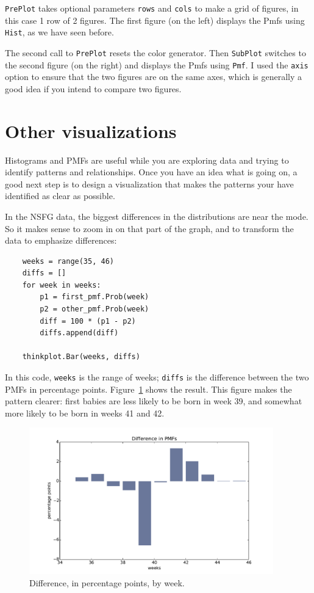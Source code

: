 \documentclass[12pt]{book}
\begin{document}
{\tt PrePlot} takes optional parameters {\tt rows} and {\tt cols}
to make a grid of figures, in this case 1 row of 2 figures.
The first figure (on the left) displays the Pmfs using {\tt Hist},
as we have seen before.

The second call to {\tt PrePlot} resets the color generator.  Then
{\tt SubPlot} switches to the second figure (on the right) and
displays the Pmfs using {\tt Pmf}.  I used the {\tt axis} option
to ensure that the two figures are on the same axes, which is
generally a good idea if you intend to compare two figures.


\section{Other visualizations}
\label{visualization}

Histograms and PMFs are useful while you are exploring data and
trying to identify patterns and relationships.
Once you have an idea what is going on, a good next step is to
design a visualization that makes the patterns your have identified
as clear as possible.

In the NSFG data, the biggest differences in the distributions are
near the mode.  So it makes sense to zoom in on that part of the
graph, and to transform the data to emphasize differences:

\begin{verbatim}
    weeks = range(35, 46)
    diffs = []
    for week in weeks:
        p1 = first_pmf.Prob(week)
        p2 = other_pmf.Prob(week)
        diff = 100 * (p1 - p2)
        diffs.append(diff)

    thinkplot.Bar(weeks, diffs)
\end{verbatim}

In this code, {\tt weeks} is the range of weeks; {\tt diffs} is the
difference between the two PMFs in percentage points.
Figure~\ref{probability_nsfg_diffs} shows the result.  This figure
makes the pattern clearer: first babies are less likely to be born in
week 39, and somewhat more likely to be born in weeks 41 and 42.

\begin{figure}
\centerline{\includegraphics[height=2.5in]{figs/probability_nsfg_diffs.pdf}}
\caption{Difference, in percentage points, by week.}
\label{probability_nsfg_diffs}
\end{figure}
\end{document}
